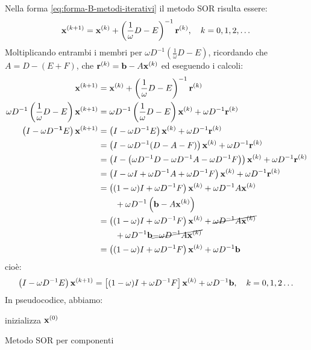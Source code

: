 Nella forma \eqref{eq:forma-B-metodi-iterativi} il metodo SOR risulta essere:
\begin{equation*}
\mathbf{x}^{( k+1)} =\mathbf{x}^{(k)} +\left(\frac{1}{\omega } D-E\right)^{-1}\mathbf{r}^{(k)} ,\quad k=0,1,2,\dotsc
\end{equation*}
Moltiplicando entrambi i membri per $\omega D^{-1}\left(\frac{1}{\omega } D-E\right)$, ricordando che $A=D-( E+F)$, che $\mathbf{r}^{( k)} =\mathbf{b} -A\mathbf{x}^{( k)}$ ed eseguendo i calcoli:
\begin{align*}
\mathbf{x}^{( k+1)} & =\mathbf{x}^{( k)} +\left(\frac{1}{\omega } D-E\right)^{-1}\mathbf{r}^{( k)}\\
\omega D^{-1}\left(\frac{1}{\omega } D-E\right)\mathbf{x}^{( k+1)} & =\omega D^{-1}\left(\frac{1}{\omega } D-E\right)\mathbf{x}^{( k)} +\omega D^{-1}\mathbf{r}^{( k)}\\
\left( I-\omega D\mathbf{^{-1}} E\right)\mathbf{x}^{( k+1)} & =\left( I-\omega D^{-1} E\right)\mathbf{x}^{( k)} +\omega D^{-1}\mathbf{r}^{( k)}\\
 & =\left( I-\omega D^{-1}( D-A-F)\right)\mathbf{x}^{( k)} +\omega D^{-1}\mathbf{r}^{( k)}\\
 & =\left( I-\left( \omega D^{-1} D-\omega D^{-1} A-\omega D^{-1} F\right)\right)\mathbf{x}^{( k)} +\omega D^{-1}\mathbf{r}^{( k)}\\
 & =\left( I-\omega I+\omega D^{-1} A+\omega D^{-1} F\right)\mathbf{x}^{( k)} +\omega D^{-1}\mathbf{r}^{( k)}\\
 & =\left(( 1-\omega ) I+\omega D^{-1} F\right)\mathbf{x}^{( k)} +\omega D^{-1} A\mathbf{x}^{( k)}\\
 & \qquad +\omega D^{-1}\left(\mathbf{b} -A\mathbf{x}^{( k)}\right)\\
 & =\left(( 1-\omega ) I+\omega D^{-1} F\right)\mathbf{x}^{( k)} +\cancel{\omega D^{-1} A\mathbf{x}^{( k)}}\\
 & \qquad +\omega D^{-1}\mathbf{b}\cancel{-\omega D^{-1} A\mathbf{x}^{( k)}}\\
 & =\left(( 1-\omega ) I+\omega D^{-1} F\right)\mathbf{x}^{( k)} +\omega D^{-1}\mathbf{b}
\end{align*}
cioè:
\begin{equation*}
\left( I-\omega D^{-1} E\right)\mathbf{x}^{( k+1)} =\left[( 1-\omega ) I+\omega D^{-1} F\right]\mathbf{x}^{( k)} +\omega D^{-1}\mathbf{b} ,\quad k=0,1,2\dotsc
\end{equation*}
In pseudocodice, abbiamo: \\
\begin{algo}
	inizializza $\mathbf{x}^{(0)}$\;
	\caption{Metodo SOR per componenti}
\end{algo}
